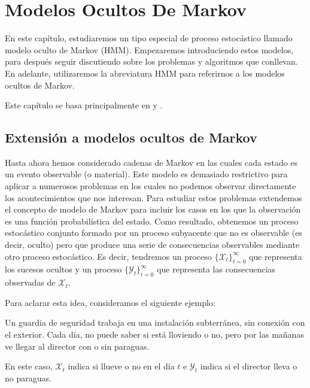 \chapter{Modelos Ocultos De Markov}

En este capítulo, estudiaremos un tipo especial de proceso estocástico llamado modelo oculto de Markov (HMM). Empezaremos introduciendo estos modelos, para después seguir discutiendo sobre los problemas y algoritmos que conllevan. En adelante, utilizaremos la abreviatura HMM para referirnos a los modelos ocultos de Markov. 

Este capítulo se basa principalmente en \cite{Rabiner} y \cite{Russell}.


\section{Extensión a modelos ocultos de Markov}
Hasta ahora hemos considerado cadenas de Markov en las cuales cada estado es un evento observable (o material). Este modelo es demasiado restrictivo para aplicar a numerosos problemas en los cuales no podemos observar directamente los acontecimientos que nos interesan. Para estudiar estos problemas extendemos el concepto de modelo de Markov para incluir los casos en los que la observación es una función probabilística del estado. Como resultado, obtenemos un proceso estocástico conjunto formado por un proceso subyacente que no es observable (es decir, oculto) pero que produce una serie de consecuencias observables mediante otro proceso estocástico. Es decir, tendremos un proceso $\{\mathcal{X}_t\}_{t=0}^{\infty}$ que representa los sucesos ocultos y un proceso $\{\mathcal{Y}_t\}_{t=0}^{\infty}$ que representa las consecuencias observadas de $\mathcal{X}_t$. 

Para aclarar esta idea, consideramos el siguiente ejemplo:

\begin{exampleth}
Un guardia de seguridad trabaja en una instalación subterránea, sin conexión con el exterior. Cada día, no puede saber si está lloviendo o no, pero por las mañanas ve llegar al director con o sin paraguas.

En este caso, $\mathcal{X}_t$ indica si llueve o no en el día $t$ e $\mathcal{Y}_t$ indica si el director lleva o no paraguas.

\end{exampleth}

